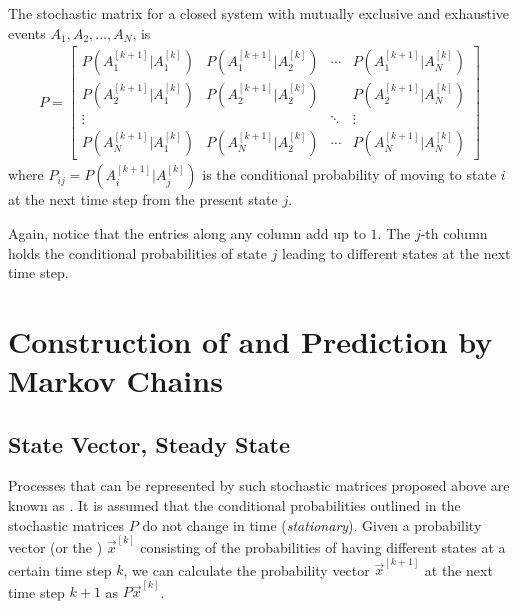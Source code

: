 \begin{defn}
\label{defn:stocmat}
The stochastic matrix for a closed system with mutually exclusive and exhaustive events $A_1, A_2, \ldots, A_N$, is
\begin{align*}
P =
\begin{bmatrix}
P(A_1^{[k+1]}|A_1^{[k]}) & P(A_1^{[k+1]}|A_2^{[k]}) & \cdots & P(A_1^{[k+1]}|A_N^{[k]})\\
P(A_2^{[k+1]}|A_1^{[k]}) & P(A_2^{[k+1]}|A_2^{[k]}) & & P(A_2^{[k+1]}|A_N^{[k]}) \\
\vdots & & \ddots & \vdots \\
P(A_N^{[k+1]}|A_1^{[k]}) & P(A_N^{[k+1]}|A_2^{[k]}) & \cdots & P(A_N^{[k+1]}|A_N^{[k]})
\end{bmatrix}
\end{align*}
where $P_{ij} = P(A_i^{[k+1]}|A_j^{[k]})$ is the conditional probability of moving to state $i$ at the next time step from the present state $j$.
\end{defn}
Again, notice that the entries along any column add up to $1$. The $j$-th column holds the conditional probabilities of state $j$ leading to different states at the next time step.

\section{Construction of and Prediction by Markov Chains}

\subsection{State Vector, Steady State}

Processes that can be represented by such stochastic matrices proposed above are known as . It is assumed that the conditional probabilities outlined in the stochastic matrices $P$ do not change in time (\textit{stationary}). Given a probability vector (or the ) $\vec{x}^{[k]}$ consisting of the probabilities of having different states at a certain time step $k$, we can calculate the probability vector $\vec{x}^{[k+1]}$ at the next time step $k+1$ as $P\vec{x}^{[k]}$.

